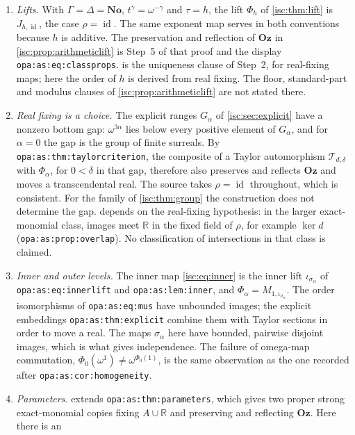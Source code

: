 \documentclass[11pt,letterpaper]{article}
\theoremstyle{definition}
\theoremstyle{remark}
\newcommand{\No}{\mathbf{No}}
\newcommand{\Oz}{\mathbf{Oz}}
\newcommand{\R}{\mathbb R}
\newcommand{\id}{\operatorname{id}}
\newcommand{\lbl}[1]{\nolinkurl{#1}}%
\numberwithin{equation}{section}
\begin{document}
\begin{enumerate}[leftmargin=*,itemsep=3pt]
\item \emph{Lifts.} With $\Gamma=\Delta=\No$, $t^\gamma=\omega^{-\gamma}$
and $\tau=h$, the lift $\Phi_h$ of \cref{isc:thm:lift} is $J_{h,\id}$, the
case $\rho=\id$. The same exponent map serves in both conventions because
$h$ is additive. The preservation and reflection of $\Oz$ in
\cref{isc:prop:arithmeticlift} is Step~5 of that proof and the display
\lbl{opa:as:eq:classprops}.  is the
uniqueness clause of Step~2, for real-fixing maps; here the order of $h$ is
derived from real fixing. The floor, standard-part and modulus clauses of
\cref{isc:prop:arithmeticlift} are not stated there.
\item \emph{Real fixing is a choice.} The explicit ranges $G_\alpha$ of
\cref{isc:sec:explicit} have a nonzero bottom gap: $\omega^{3\alpha}$ lies
below every positive element of $G_\alpha$, and for $\alpha=0$ the gap is
the group of finite surreals. By \lbl{opa:as:thm:taylorcriterion}, the
composite of a Taylor automorphism $\mathcal T_{d,\delta}$ with $\Phi_\alpha$,
for $0<\delta$ in that gap, therefore also preserves and reflects $\Oz$ and
moves a transcendental real. The source takes $\rho=\id$ throughout, which
is consistent. For the family of \cref{isc:thm:group} the construction does
not determine the gap.  depends on
the real-fixing hypothesis: in the larger exact-monomial class, images meet
$\R$ in the fixed field of $\rho$, for example $\ker d$
(\lbl{opa:as:prop:overlap}). No classification of intersections in that
class is claimed.
\item \emph{Inner and outer levels.} The inner map \eqref{isc:eq:inner} is
the inner lift $\iota_{\sigma_\alpha}$ of \lbl{opa:as:eq:innerlift} and
\lbl{opa:as:lem:inner}, and $\Phi_\alpha=M_{1,\iota_{\sigma_\alpha}}$. The
order isomorphisms of \lbl{opa:as:eq:mus} have unbounded images; the
explicit embeddings \lbl{opa:as:thm:explicit} combine them with Taylor
sections in order to move a real. The maps $\sigma_\alpha$ here have
bounded, pairwise disjoint images, which is what gives independence. The
failure of omega-map commutation, $\Phi_0(\omega^1)\ne\omega^{\Phi_0(1)}$,
is the same observation as the one recorded after
\lbl{opa:as:cor:homogeneity}.
\item \emph{Parameters.}  extends
\lbl{opa:as:thm:parameters}, which gives two proper strong exact-monomial
copies fixing $A\cup\R$ and preserving and reflecting $\Oz$. Here there is an

\end{enumerate}
\end{document}
